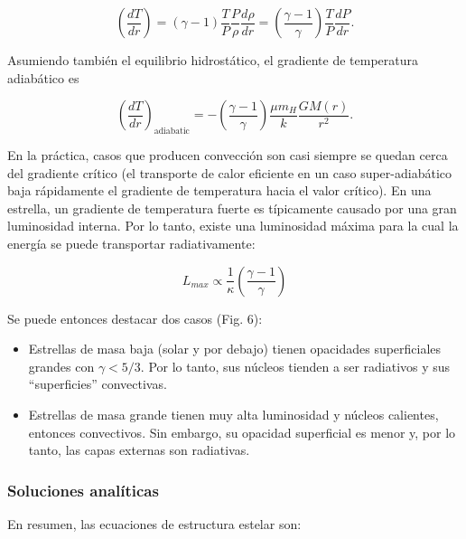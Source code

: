 \documentclass[11pt,letterpaper]{article}
\begin{document}
\begin{itemize}
        \begin{equation}
            \left( \frac{dT}{dr} \right) = (\gamma - 1) \frac{T}{P} \frac{P}{\rho} \frac{d\rho}{dr} = \left( \frac{\gamma - 1}{\gamma} \right) \frac{T}{P} \frac{dP}{dr}.
        \end{equation}

        Asumiendo también el equilibrio hidrostático, el gradiente de temperatura adiabático es

        \begin{equation}
            \left( \frac{dT}{dr} \right)_{\text{adiabatic}} = -\left( \frac{\gamma - 1}{\gamma} \right) \frac{\mu m_H}{k} \frac{GM(r)}{r^2}.
        \end{equation}

        En la práctica, casos que producen convección son casi siempre se quedan cerca del gradiente crítico (el transporte de calor eficiente en un caso super-adiabático baja rápidamente el gradiente de temperatura hacia el valor crítico). En una estrella, un gradiente de temperatura fuerte es típicamente causado por una gran luminosidad interna. Por lo tanto, existe una luminosidad máxima para la cual la energía se puede transportar radiativamente:

        \begin{equation}
            L_{max} \propto \frac{1}{\kappa} \left( \frac{\gamma - 1}{\gamma} \right)
        \end{equation}

        Se puede entonces destacar dos casos (Fig. 6):
        \begin{itemize}
            \item Estrellas de masa baja (solar y por debajo) tienen opacidades superficiales grandes con \(\gamma < 5/3\). Por lo tanto, sus núcleos tienden a ser radiativos y sus ``superficies'' convectivas.
            \item Estrellas de masa grande tienen muy alta luminosidad y núcleos calientes, entonces convectivos. Sin embargo, su opacidad superficial es menor y, por lo tanto, las capas externas son radiativas.
        \end{itemize}
    \end{itemize}

\subsubsection{Soluciones analíticas}

En resumen, las ecuaciones de estructura estelar son:
\end{document}
